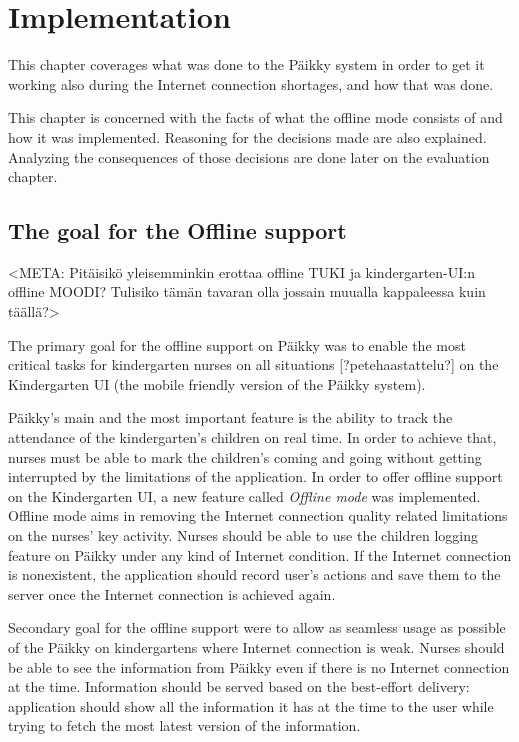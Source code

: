 
\chapter{Implementation}
This chapter coverages what was done to the Päikky system in order to get it working also during the Internet connection shortages, and how that was done. 

This chapter is concerned with the facts of what the offline mode consists of and how it was implemented. Reasoning for the decisions made are also explained. Analyzing the consequences of those decisions are done later on the evaluation chapter.

\section{The goal for the Offline support}

<META: Pitäisikö yleisemminkin erottaa offline TUKI ja kindergarten-UI:n offline MOODI? Tulisiko tämän tavaran olla jossain muualla kappaleessa kuin täällä?>

The primary goal for the offline support on Päikky was to enable the most critical tasks for kindergarten nurses on all situations [?petehaastattelu?] on the Kindergarten UI (the mobile friendly version of the Päikky system). 

Päikky's main and the most important feature is the ability to track the attendance of the kindergarten's children on real time. In order to achieve that, nurses must be able to mark the children's coming and going without getting interrupted by the limitations of the application. In order to offer offline support on the Kindergarten UI, a new feature called \textit{Offline mode} was implemented. Offline mode aims in removing the Internet connection quality related limitations on the nurses' key activity. Nurses should be able to use the children logging feature on Päikky under any kind of Internet condition. If the Internet connection is nonexistent, the application should record user's actions and save them to the server once the Internet connection is achieved again.

Secondary goal for the offline support were to allow as seamless usage as possible of the Päikky on kindergartens where Internet connection is weak. Nurses should be able to see the information from Päikky even if there is no Internet connection at the time. Information should be served based on the best-effort delivery: application should show all the information it has at the time to the user while trying to fetch the most latest version of the information.

